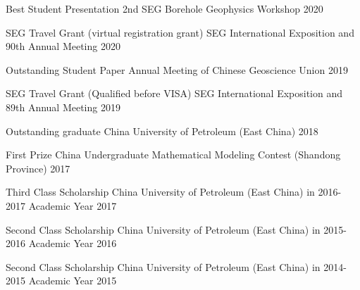 
\begin{cvhonors}

  \cvhonor
    {Best Student Presentation} %
    {2nd SEG Borehole Geophysics Workshop} %
    {} %
    {2020} %

  \cvhonor
    {SEG Travel Grant (virtual registration grant)} %
    {SEG International Exposition and 90th Annual Meeting} %
    {} %
    {2020} %

  \cvhonor
    {Outstanding Student Paper} %
    {Annual Meeting of Chinese Geoscience Union} %
    {} %
    {2019} %

  \cvhonor
    {SEG Travel Grant (Qualified before VISA)} %
    {SEG International Exposition and 89th Annual Meeting} %
    {} %
    {2019} %

  \cvhonor
    {Outstanding graduate} %
    {China University of Petroleum (East China)} %
    {} %
    {2018} %

  \cvhonor
    {First Prize} %
    {China Undergraduate Mathematical Modeling Contest (Shandong Province)} %
    {} %
    {2017} %

  \cvhonor
    {Third Class Scholarship} %
    {China University of Petroleum (East China) in 2016-2017 Academic Year} %
    {} %
    {2017} %

  \cvhonor
    {Second Class Scholarship} %
    {China University of Petroleum (East China) in 2015-2016 Academic Year} %
    {} %
    {2016} %

  \cvhonor
    {Second Class Scholarship} %
    {China University of Petroleum (East China) in 2014-2015 Academic Year} %
    {} %
    {2015} %

\end{cvhonors}
